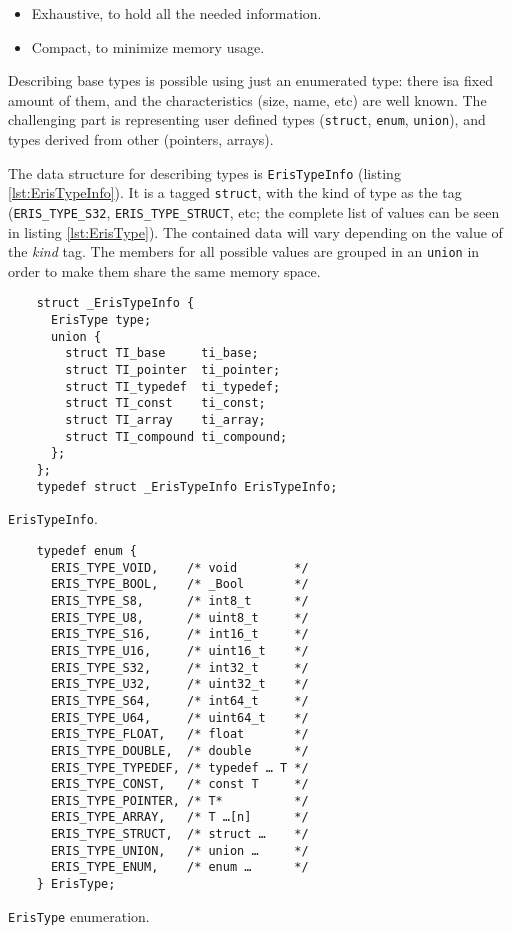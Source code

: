 \begin{itemize}
  \item Exhaustive, to hold all the needed information.
  \item Compact, to minimize memory usage.
\end{itemize}

Describing base types is possible using just an enumerated type: there isa
fixed amount of them, and the characteristics (size, name, etc) are well
known. The challenging part is representing user defined types
(\texttt{struct}, \texttt{enum}, \texttt{union}), and
types derived from other (pointers, arrays).

The data structure for describing types is \verb|ErisTypeInfo| (listing
\vref{lst:ErisTypeInfo}). It is a tagged \texttt{struct}, with the kind
of type as the tag (\verb|ERIS_TYPE_S32|, \verb|ERIS_TYPE_STRUCT|, etc; the
complete list of values can be seen in listing \vref{lst:ErisType}). The
contained data will vary depending on the value of the \emph{kind} tag. The
members for all possible values are grouped in an \texttt{union} in
order to make them share the same memory space.

\begin{listing}[h]
  \begin{verbatim}
    struct _ErisTypeInfo {
      ErisType type;
      union {
        struct TI_base     ti_base;
        struct TI_pointer  ti_pointer;
        struct TI_typedef  ti_typedef;
        struct TI_const    ti_const;
        struct TI_array    ti_array;
        struct TI_compound ti_compound;
      };
    };
    typedef struct _ErisTypeInfo ErisTypeInfo;
  \end{verbatim}
  \caption{\texttt{ErisTypeInfo}.}
  \label{lst:ErisTypeInfo}
\end{listing}

\begin{listing}[f]
  \centering
  \begin{verbatim}
    typedef enum {
      ERIS_TYPE_VOID,    /* void        */
      ERIS_TYPE_BOOL,    /* _Bool       */
      ERIS_TYPE_S8,      /* int8_t      */
      ERIS_TYPE_U8,      /* uint8_t     */
      ERIS_TYPE_S16,     /* int16_t     */
      ERIS_TYPE_U16,     /* uint16_t    */
      ERIS_TYPE_S32,     /* int32_t     */
      ERIS_TYPE_U32,     /* uint32_t    */
      ERIS_TYPE_S64,     /* int64_t     */
      ERIS_TYPE_U64,     /* uint64_t    */
      ERIS_TYPE_FLOAT,   /* float       */
      ERIS_TYPE_DOUBLE,  /* double      */
      ERIS_TYPE_TYPEDEF, /* typedef … T */
      ERIS_TYPE_CONST,   /* const T     */
      ERIS_TYPE_POINTER, /* T*          */
      ERIS_TYPE_ARRAY,   /* T …[n]      */
      ERIS_TYPE_STRUCT,  /* struct …    */
      ERIS_TYPE_UNION,   /* union …     */
      ERIS_TYPE_ENUM,    /* enum …      */
    } ErisType;
  \end{verbatim}
  \caption{\texttt{ErisType} enumeration.}
  \label{lst:ErisType}
\end{listing}


